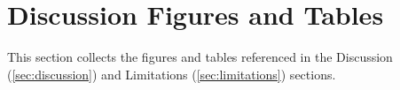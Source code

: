 
\section{Discussion Figures and Tables}
\label{sec:appendix_discussion_floats}

\noindent
This section collects the figures and tables referenced in the Discussion (\cref{sec:discussion}) and Limitations (\cref{sec:limitations}) sections.


